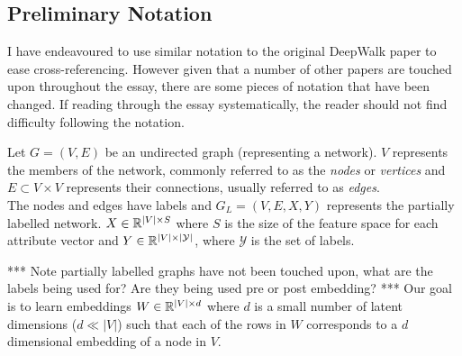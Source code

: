 \documentclass[a4paper]{article}
\begin{document}
\subsection{Preliminary Notation}
I have endeavoured to use similar notation to the original DeepWalk paper\cite{deepwalk} to ease
cross-referencing. However given that a number of other papers are touched upon
throughout the essay, there are some pieces of notation that have been changed.
If reading through the essay systematically, the reader should not find
difficulty following the notation.

\begin{definition}
  Let $G = (V, E)$ be an undirected graph (representing a network). $V$ represents the
  members of the network, commonly referred to as the \textit{nodes} or \textit{vertices} and $E \subset V
  \times V$ represents their connections, usually referred to as
  \textit{edges}.\\
  The nodes and edges have labels and $G_L = (V, E, X, Y)$ represents the
  partially labelled network. $X \in \R^{|V| \times S}$ where $S$ is the size of
  the feature space for each attribute vector and $Y \in \R^{|V|
    \times|\mathcal{Y}|}$, where $\mathcal{Y}$ is the set of labels.
\end{definition}
*** Note partially labelled graphs have not been touched upon, what are the
labels being used for? Are they being used pre or post embedding? ***
Our goal is to learn embeddings $W \in \R^{|V| \times d}$ where $d$ is a small number
of latent dimensions ($d \ll |V|$) such that each of the rows in $W$
corresponds to a $d$ dimensional embedding of a node in $V$.
\end{document}
